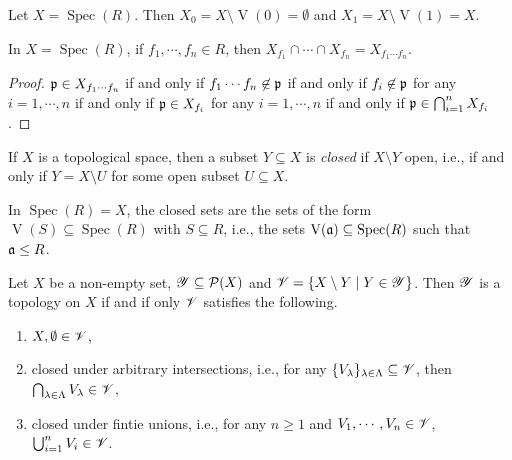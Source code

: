 \begin{fact}
    Let $X = \operatorname{Spec}(R)$. Then $X_0 = X \setminus \operatorname{V}(0) = \emptyset$ and $X_1 = X \setminus \operatorname{V}(1) = X$.
\end{fact}

\begin{proposition}
    In $X = \operatorname{Spec}(R)$, if $f_1,\cdots,f_n \in R$, then $X_{f_1} \cap \cdots \cap X_{f_n} = X_{f_1 \cdots f_n}$.
\end{proposition}

\begin{proof}
    $\mathfrak{p} \in X_{f_1 \cdots f_n}$ if and only if $f_1 \cdots f_n \not \in \mathfrak{p}$ if and only if $f_i \not \in \mathfrak{p}$ for any $i = 1,\cdots,n$ if and only if $\mathfrak{p} \in X_{f_i}$ for any $i = 1,\cdots,n$ if and only if $\mathfrak{p} \in \bigcap_{i=1}^n X_{f_i}$.
\end{proof}

\begin{definition}
    If $X$ is a topological space, then a subset $Y \subseteq X$ is \emph{closed} if $X \setminus Y$ open, i.e., if and only if $Y = X \setminus U$ for some open subset $U \subseteq X$.
\end{definition}

\begin{example}
    In $\operatorname{Spec}(R) = X$, the closed sets are the sets of the form $\operatorname{V}(S) \subseteq \operatorname{Spec}(R)$ with $S \subseteq R$, i.e., the sets $\operatorname{V}(\mathfrak{a}) \subseteq \operatorname{Spec}(R)$ such that $\mathfrak{a} \leq R$.
\end{example}

\begin{proposition}
    Let $X$ be a non-empty set, $\mathscr{Y} \subseteq \mathcal{P}(X)$ and $\mathscr{V} = \{X \setminus Y \mid Y \in \mathscr{Y}\}$. Then $\mathscr{Y}$ is a topology on $X$ if and if only $\mathscr{V}$ satisfies the following.
    \begin{enumerate}
        \item $X,\emptyset \in \mathscr{V}$,
        \item closed under arbitrary intersections, i.e., for any $\{V_\lambda\}_{\lambda \in \Lambda} \subseteq \mathscr{V}$, then $\bigcap_{\lambda \in \Lambda} V_\lambda \in \mathscr{V}$,
        \item closed under fintie unions, i.e., for any $n \geq 1$ and $V_1,\cdots,V_n \in \mathscr{V}$, $\bigcup_{i=1}^n V_i \in \mathscr{V}$.
    \end{enumerate}
\end{proposition}

